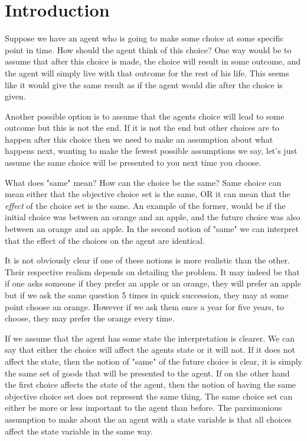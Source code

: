 \documentclass[12pt]{report}
\numberwithin{equation}{section}
\begin{document}
\section{Introduction}

Suppose we have an agent who is going to make some choice at some specific point in time. How should the agent think of this choice? One way would be to assume that after this choice is made, the choice will result in some outcome, and the agent will simply live with that outcome for the rest of his life. This seems like it would give the same result as if the agent would die after the choice is given.

Another possible option is to assume that the agents choice will lead to some outcome but this is not the end. If it is not the end but other choices are to happen after this choice then we need to make an assumption about what happens next, wanting to make the fewest possible assumptions we say, let's just assume the same choice will be presented to you next time you choose. 

What does "same" mean? How can the choice be the same? Same choice can mean either that the objective choice set is the same, OR it can mean that the \textit{effect} of the choice set is the same. An example of the former, would be if the initial choice was between an orange and an apple, and the future choice was also between an orange and an apple. In the second notion of "same" we can interpret that the effect of the choices on the agent are identical. 

It is not obviously clear if one of these notions is more realistic than the other. Their respective realism depends on detailing the problem. It may indeed be that if one asks someone if they prefer an apple or an orange, they will prefer an apple but if we ask the same question 5 times in quick succession, they may at some point choose an orange. However if we ask them once a year for five years, to choose, they may prefer the orange every time. 

If we assume that the agent has some state the interpretation is clearer. We can say that either the choice will affect the agents state or it will not. If it does not affect the state, then the notion of "same" of the future choice is clear, it is simply the same set of goods that will be presented to the agent. If on the other hand the first choice affects the state of the agent, then the notion of having the same objective choice set does not represent the same thing. The same choice set can either be more or less important to the agent than before. The parsimonious assumption to make about the an agent with a state variable is that all choices affect the state variable in the same way. 
\end{document}
